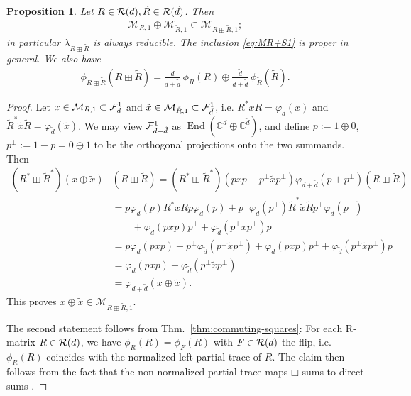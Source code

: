 \documentclass[12pt,a4paper]{amsart}
\numberwithin{equation}{section}
\newtheorem{proposition}[theorem]{Proposition}
\theoremstyle{remark}
\def\End{\operatorname{End}}
\newcommand{\Cl}{\mathbb{C}}
\newcommand{\la}{\lambda}
\newcommand{\CM}[0]{\mathcal{M}} \newcommand{\CN}[0]{\mathcal{N}}
\begin{document}
\begin{proposition}
	Let $R\in\mathcal{R}(d),\tilde R\in\mathcal{R}(\tilde d)$. Then 
	\begin{align}\label{eq:MR+S1}
		\CM_{R,1}\oplus\CM_{\tilde R,1}\subset\CM_{R\boxplus \tilde R,1};
	\end{align}
	in particular $\la_{R\boxplus \tilde R}$ is always reducible. The inclusion \eqref{eq:MR+S1} is proper in general. We also have
	\begin{align}
		\phi_{R\boxplus \tilde R}(R\boxplus \tilde R)
		=
		\frac{d}{d+\tilde d}\,\phi_R(R) \oplus \frac{\tilde d}{d+\tilde d}\,\phi_{\tilde R}(\tilde R).
	\end{align}
\end{proposition}
\begin{proof}
	Let $x\in\CM_{R,1}\subset\CF_d^1$ and $\tilde x\in\CM_{\tilde R,1}\subset\CF_{\tilde d}^1$, i.e. $R^*xR=\varphi_d(x)$ and $\tilde R^*\tilde x\tilde R=\varphi_{\tilde d}(\tilde x)$. We may view $\mathcal{F}_{d+\tilde d}^1$ as $\End(\Cl^d\oplus\Cl^{\tilde d})$, and define $p:=1\oplus0$, $p^\perp:=1-p=0\oplus1$ to be the orthogonal projections onto the two summands. Then
	\begin{align*}
		(R^*\boxplus\tilde R^*)(x\oplus\tilde x)&(R\boxplus\tilde R)
		=
		(R^*\boxplus\tilde R^*)(pxp+p^\perp \tilde xp^\perp)\varphi_{d+\tilde d}(p+p^\perp)(R\boxplus\tilde R)
		\\
		&=
		p\varphi_d(p)R^*xRp\varphi_d(p)+p^\perp\varphi_{\tilde d}(p^\perp)\tilde R^*\tilde x\tilde Rp^\perp\varphi_{\tilde d}(p^\perp)
		\\
		&\qquad+
		\varphi_d(pxp)p^\perp + \varphi_{\tilde d}(p^\perp\tilde xp^\perp)p
		\\
		&=
		p\varphi_d(pxp)+p^\perp\varphi_{\tilde d}(p^\perp\tilde x p^\perp)
		+
		\varphi_d(pxp)p^\perp + \varphi_{\tilde d}(p^\perp\tilde xp^\perp)p
		\\
		&=
		\varphi_d(pxp)+\varphi_{\tilde d}(p^\perp\tilde x p^\perp)
		\\
		&=
		\varphi_{d+\tilde d}(x\oplus\tilde x).
	\end{align*}
	This proves $x\oplus\tilde x\in\CM_{R\boxplus \tilde R,1}$.
	
	The second statement follows from Thm.~\ref{thm:commuting-squares}: For each R-matrix $R\in\mathcal{R}(d)$, we have $\phi_R(R)=\phi_F(R)$ with $F\in\mathcal{R}(d)$ the flip, i.e. $\phi_R(R)$ coincides with the normalized left partial trace of $R$. The claim then follows from the fact that the non-normalized partial trace maps $\boxplus$ sums to direct sums \cite[Lemma 4.2~iv)]{LechnerPennigWood:2019}.
\end{proof}
\end{document}
